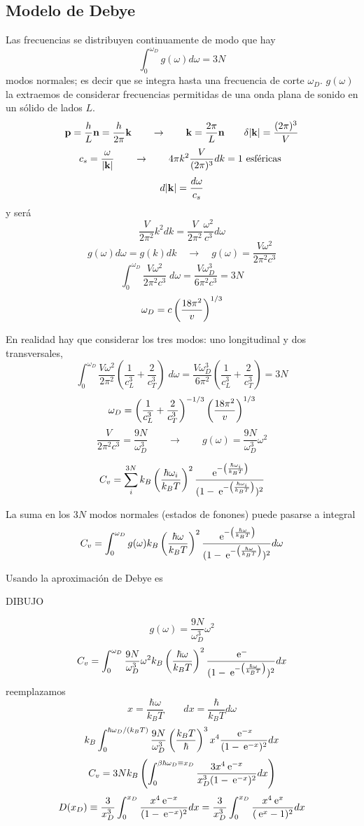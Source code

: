 \documentclass[10pt,oneside]{CBFT_book}
\begin{document}
\subsection{Modelo de Debye}

Las frecuencias se distribuyen continuamente de modo que hay 
\[
	\int_0^{\omega_D} g(\omega) d\omega = 3N
\]
modos normales; es decir que se integra hasta una frecuencia de corte $\omega_D$. $g(\omega)$ la extraemos de 
considerar frecuencias permitidas de una onda plana de sonido en un sólido de lados $L$.
\[
	\vb{p} = \frac{h}{L}\vb{n} = \frac{h}{2\pi}\vb{k} \qquad \rightarrow  \qquad \vb{k} = \frac{2\pi}{L}\vb{n}
	\qquad \delta |\vb{k}| = \frac{(2\pi)^3}{V}
\]
\[
	c_s = \frac{\omega}{|\vb{k}|} \qquad \rightarrow \qquad  4 \pi k^2 \frac{V}{(2\pi)^3} dk = 1 \text{ esféricas }
\]
\[
	d|\vb{k}| = \frac{d\omega}{c_s}
\]
y será 
\[
	\frac{V}{2\pi^2} k^2 dk = \frac{V}{2\pi^2} \frac{\omega^2}{c^3} d\omega
\]
\[
	g(\omega) d\omega = g(k) dk \quad \rightarrow \quad g(\omega) = \frac{V\omega^2}{2\pi^2c^3}
\]
\[
	\int_0^{\omega_D} \frac{V\omega^2}{2\pi^2c^3} \; d\omega = \frac{V\omega_D^3}{6\pi^2 c^3} = 3N
\]
\[
	\omega_D = c \left( \frac{ 18\pi^2 }{ v } \right)^{1/3}
\]

En realidad hay que considerar los tres modos: uno longitudinal y dos transversales,
\[
	\int_0^{\omega_D} \frac{V\omega^2}{2\pi^2} \left( \frac{1}{c_L^3} + \frac{2}{c_T^3} \right) \; d\omega = 
	\frac{V\omega_D^3}{6\pi^2} \left( \frac{1}{c_L^3} + \frac{2}{c_T^3} \right) = 3N
\]
\[
	\omega_D = \left( \frac{1}{c_L^3} + \frac{2}{c_T^3} \right)^{-1/3} \left( \frac{ 18\pi^2 }{ v } \right)^{1/3}
\]
\[
	\frac{V}{2\pi^2c^3} = \frac{9N}{\omega_D^3} \qquad \rightarrow \qquad g(\omega) = \frac{9N}{\omega_D^3} \omega^2
\]


\[
	C_v = \sum_i^{3N} k_B \left( \frac{  \hbar \omega_i  }{  k_B T  } \right)^2 
	\frac{ \:\mathrm{e}^{-\left( \frac{ \hbar\omega_i }{ k_BT } \right)} }{ (1-\:\mathrm{e}^{-\left( \frac{ \hbar\omega_i }{ k_BT } \right)})^2}
\]

La suma en los $ 3N $ modos normales (estados de fonones) puede pasarse a integral 
\[
	C_v = \int_0^{\omega_D} g(\omega) k_B \left( \frac{ \hbar\omega }{ k_BT } \right)^2 
	\frac{ \:\mathrm{e}^{-\left( \frac{ \hbar\omega }{ k_BT } \right)} }{ (1-\:\mathrm{e}^{-\left( \frac{ \hbar\omega }{ k_BT } \right)})^2} d\omega
\]

Usando la aproximación de Debye es 

DIBUJO 

\[
	g(\omega) = \frac{9N}{\omega_D^3} \omega^2
\]
\[
	C_v = \int_0^{\omega_D} \frac{9N}{\omega_D^3} \omega^2 k_B \left( \frac{ \hbar\omega }{ k_BT } \right)^2 
	\frac{ \:\mathrm{e}^{-} }{ (1-\:\mathrm{e}^{-\left( \frac{ \hbar\omega }{ k_BT } \right)})^2} dx 
\]
reemplazamos
\[
	x = \frac{\hbar\omega}{k_B T} \qquad dx = \frac{ \hbar }{k_B T} d\omega
\]
\[
	k_B \int_0^{\hbar \omega_D / ( k_B T )} 
	\frac{9N}{\omega_D^3} \left( \frac{ k_BT }{ \hbar } \right)^3 x^4 \frac{ \:\mathrm{e}^{-x} }{ (1-\:\mathrm{e}^{-x})^2} dx 
\]
\[
	C_v = 3Nk_B \left( 
	\int_0^{\beta \hbar \omega_D \equiv x_D} \frac{ 3 x^4 \:\mathrm{e}^{-x} }{ x_D^3 (1-\:\mathrm{e}^{-x})^2} dx 
	\right)
\]
\[
	D(x_D) \equiv \frac{3}{x_D^3} \int_0^{x_D} \frac{x^4 \:\mathrm{e}^{-x} }{(1-\:\mathrm{e}^{-x})^2} dx 
	= \frac{3}{x_D^3} \int_0^{x_D} \frac{x^4 \:\mathrm{e}^{x} }{( \:\mathrm{e}^{x} - 1 )^2} dx 
\]
\end{document}

